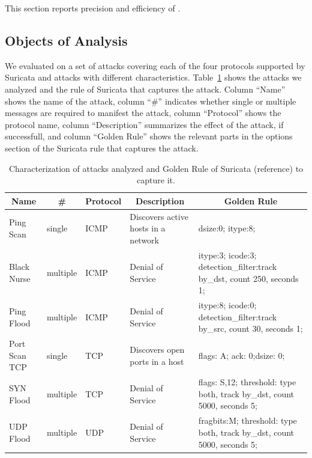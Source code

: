 \documentclass[runningheads]{llncs}
\begin{document}
This section reports precision and efficiency of \tname.


\subsection{Objects of Analysis}

We evaluated \tname{} on a set of attacks covering each of the four
protocols supported by Suricata and attacks with different
characteristics. Table~\ref{table:attacks} shows the attacks we
analyzed and the rule of Suricata that captures the attack. Column
``Name'' shows the name of the attack, column ``\#'' indicates whether
single or multiple messages are required to manifest the attack,
column ``Protocol'' shows the protocol name, column ``Description''
summarizes the effect of the attack, if successfull, and column
``Golden Rule'' shows the relevant parts in the options section of the
Suricata rule that captures the attack.

\begin{table}[t!]
  \caption{\label{table:attacks}Characterization of attacks analyzed
    and Golden Rule of Suricata (reference) to capture it.}  
  \centering
  \begin{tabular}{lllll}
    \toprule
    \multicolumn{1}{c}{Name} & \multicolumn{1}{c}{\#} & \multicolumn{1}{c}{Protocol} & \multicolumn{1}{c}{Description} & \multicolumn{1}{c}{Golden Rule} \\
    \midrule     
    Ping Scan & single & ICMP & Discovers active hosts in a network &  dsize:0; itype:8; \\
    Black Nurse & multiple & ICMP & Denial of Service & itype:3; icode:3; detection\_filter:track by\_dst, count 250, seconds 1;\\
    Ping Flood  & multiple & ICMP & Denial of Service & itype:8; icode:0; detection\_filter:track by\_src, count 30, seconds 1;\\  
    Port Scan TCP & single & TCP & Discovers open ports in a host & flags: A; ack: 0;dsize: 0; \\
    SYN Flood & multiple & TCP & Denial of Service & flags: S,12; threshold: type both, track by\_dst, count 5000, seconds 5;\\
    UDP Flood & multiple & UDP & Denial of Service & fragbits:M; threshold: type both, track by\_dst, count 5000, seconds 5; \\
    \bottomrule
  \end{tabular}
\end{table}
\end{document}

